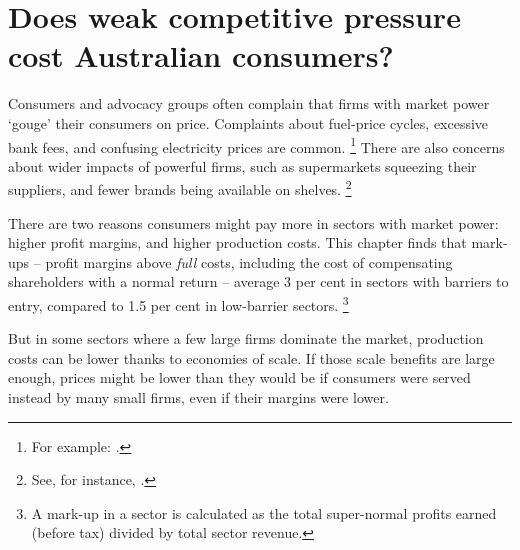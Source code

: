 \chapter{Does weak competitive pressure cost Australian consumers? \label{chap:welfare}}

Consumers and advocacy groups often complain that firms with market power `gouge' their consumers on price. Complaints about fuel-price cycles, excessive bank fees, and confusing electricity prices are common.%
    \footnote{For example: \textcites{supermoney-bank-rip-off}{courier-mail-fuel-price-cycle}{herald-sun-fuel-price-cycle}{make-it-cheaper-electricity-price-gouging}.}
There are also concerns about wider impacts of powerful firms, such as supermarkets squeezing their suppliers, and fewer brands being available on shelves.%
    \footnote{See, for instance, \textcites{monthly-supermarkets}{choice-brands-disappearing}.}

There are two reasons consumers might pay more in sectors with market power: higher profit margins, and higher production costs.
This chapter finds that mark-ups -- profit margins above \emph{full} costs, including the cost of compensating shareholders with a normal return -- average 3 per cent in sectors with barriers to entry, compared to 1.5 per cent in low-barrier sectors.%
    \footnote{A mark-up in a sector is calculated as the total super-normal profits earned (before tax) divided by total sector revenue.}

But in some sectors where a few large firms dominate the market, production costs can be lower thanks to economies of scale. If those scale benefits are large enough, prices might be lower than they would be if consumers were served instead by many small firms, even if their margins were lower. 

